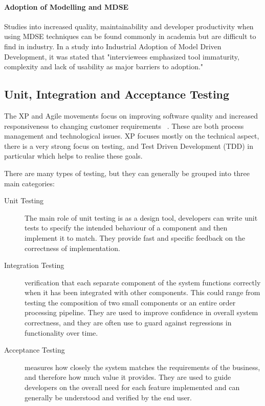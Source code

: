 \documentclass{cshonours}
\begin{document}
\paragraph{Adoption of Modelling and MDSE}

Studies into increased quality, maintainability and developer productivity when using MDSE techniques can be found commonly in academia but are difficult to find in industry. In a study into Industrial Adoption of Model Driven Development, it was stated that "interviewees emphasized tool immaturity, complexity and lack of usability as major barriers to adoption."  ~\cite{IndustryMDSE}

\pagebreak
\subsection{Unit, Integration and Acceptance Testing}

The XP and Agile movements focus on improving software quality and increased responsiveness to changing customer requirements ~\cite{WikiXP}. These are both process management and technological issues. XP focuses mostly on the technical aspect, there is a very strong focus on testing, and Test Driven Development (TDD) in particular which helps to realise these goals.

There are many types of testing, but they can generally be grouped into three main categories:

\begin{description}
  \item[Unit Testing] The main role of unit testing is as a design tool, developers can write unit tests to specify the intended behaviour of a component and then implement it to match. They provide fast and specific feedback on the correctness of implementation.
  \item[Integration Testing] verification that each separate component of the system functions correctly when it has been integrated with other components. This could range from testing the composition of two small components or an entire order processing pipeline. They are used to improve confidence in overall system correctness, and they are often use to guard against regressions in functionality over time.
  \item[Acceptance Testing] measures how closely the system matches the requirements of the business, and therefore how much value it provides. They are used to guide developers on the overall need for each feature implemented and can generally be understood and verified by the end user.
\end{description}
\end{document}
